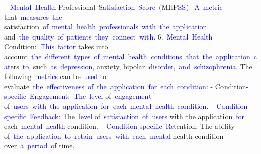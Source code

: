 \documentclass{article}
\begin{document}
\begin{tcolorbox}[colframe=black,colback=white]
{}\textcolor{blue}{-}\textcolor{blue}{~Mental}\textcolor{blue}{~Health} Professional\textcolor{blue}{~Satisfaction}\textcolor{blue}{~Score}\textcolor{blue}{~(}MHP\textcolor{blue}{SS}\textcolor{blue}{):}\textcolor{blue}{~A}\textcolor{blue}{~metric} that\textcolor{blue}{~measures}\textcolor{blue}{~the} satisfaction\textcolor{blue}{~of}\textcolor{blue}{~mental}\textcolor{blue}{~health}\textcolor{blue}{~professionals}\textcolor{blue}{~with}\textcolor{blue}{~the}\textcolor{blue}{~application} and\textcolor{blue}{~the}\textcolor{blue}{~quality}\textcolor{blue}{~of}\textcolor{blue}{~patients}\textcolor{blue}{~they}\textcolor{blue}{~connect}\textcolor{blue}{~with}\textcolor{blue}{.
}6.\textcolor{blue}{~Mental}\textcolor{blue}{~Health} Condition:\textcolor{blue}{~This}\textcolor{blue}{~factor} takes into account\textcolor{blue}{~the}\textcolor{blue}{~different}\textcolor{blue}{~types}\textcolor{blue}{~of}\textcolor{blue}{~mental}\textcolor{blue}{~health}\textcolor{blue}{~conditions}\textcolor{blue}{~that}\textcolor{blue}{~the}\textcolor{blue}{~application}\textcolor{blue}{~cat}ers\textcolor{blue}{~to}, such\textcolor{blue}{~as}\textcolor{blue}{~depression}\textcolor{blue}{,} anxiety\textcolor{blue}{,} bipolar\textcolor{blue}{~disorder}\textcolor{blue}{,}\textcolor{blue}{~and}\textcolor{blue}{~schizophrenia}\textcolor{blue}{.} The following\textcolor{blue}{~metrics} can be\textcolor{blue}{~used} to evaluate\textcolor{blue}{~the}\textcolor{blue}{~effectiveness}\textcolor{blue}{~of}\textcolor{blue}{~the}\textcolor{blue}{~application}\textcolor{blue}{~for}\textcolor{blue}{~each}\textcolor{blue}{~condition}\textcolor{blue}{:
}\textcolor{blue}{-} Condition\textcolor{blue}{-specific}\textcolor{blue}{~Engagement}\textcolor{blue}{:}\textcolor{blue}{~The}\textcolor{blue}{~level} of\textcolor{blue}{~engagement} of\textcolor{blue}{~users}\textcolor{blue}{~with}\textcolor{blue}{~the}\textcolor{blue}{~application}\textcolor{blue}{~for}\textcolor{blue}{~each}\textcolor{blue}{~mental}\textcolor{blue}{~health}\textcolor{blue}{~condition}\textcolor{blue}{.
}\textcolor{blue}{-}\textcolor{blue}{~Condition}\textcolor{blue}{-specific}\textcolor{blue}{~Feedback}\textcolor{blue}{:} The\textcolor{blue}{~level} of\textcolor{blue}{~satisfaction}\textcolor{blue}{~of}\textcolor{blue}{~users} with the application\textcolor{blue}{~for} each\textcolor{blue}{~mental}\textcolor{blue}{~health} condition\textcolor{blue}{.
}\textcolor{blue}{-}\textcolor{blue}{~Condition}\textcolor{blue}{-specific}\textcolor{blue}{~Ret}ention\textcolor{blue}{:} The ability of\textcolor{blue}{~the}\textcolor{blue}{~application}\textcolor{blue}{~to}\textcolor{blue}{~retain}\textcolor{blue}{~users}\textcolor{blue}{~with}\textcolor{blue}{~each}\textcolor{blue}{~mental} health condition over\textcolor{blue}{~a}\textcolor{blue}{~period}\textcolor{blue}{~of} time\textcolor{blue}{.
}
\end{tcolorbox}
\end{document}
